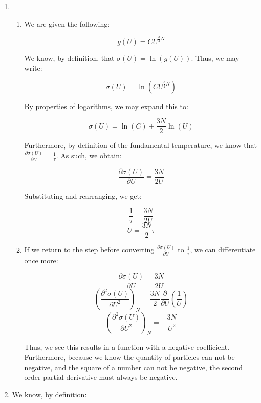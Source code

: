 \begin{enumerate}

  \item

    \begin{enumerate}

      \item 

        We are given the following:

        $$g(U)=CU^{\frac{3}{2}N}$$

        We know, by definition, that $\sigma(U)=\ln(g(U))$. Thus, we may write:

        $$\sigma(U)=\ln(CU^{\frac{3}{2}N})$$

        By properties of logarithms, we may expand this to:

        $$\sigma(U)=\ln(C)+\frac{3N}{2}\ln(U)$$

        Furthermore, by definition of the fundamental temperature, we know that $\displaystyle\frac{\partial\sigma(U)}{\partial U}=\frac{1}{\tau}$. As such, we obtain:

        $$\frac{\partial \sigma(U)}{\partial U}=\frac{3N}{2U}$$

        Substituting and rearranging, we get:

        $$\frac{1}{\tau}=\frac{3N}{2U}$$
        $$\boxed{U=\frac{3N}{2}\tau}$$

      \item 

        If we return to the step before converting $\displaystyle\frac{\partial\sigma(U)}{\partial U}$ to $\frac{1}{\tau}$, we can differentiate once more:

        $$\frac{\partial \sigma(U)}{\partial U}=\frac{3N}{2U}$$
        $$\left(\frac{\partial^2\sigma(U)}{\partial U^2}\right)_N=\frac{3N}{2}\frac{\partial}{\partial U}\left( \frac{1}{U} \right)$$
        $$\boxed{\left(\frac{\partial^2\sigma(U)}{\partial U^2}\right)_N=-\frac{3N}{U^2}}$$

        Thus, we see this results in a function with a negative coefficient. Furthermore, because we know the quantity of particles can not be negative, and the square of a number can not be negative, the second order partial derivative must always be negative.

    \end{enumerate}

  \item

    We know, by definition:


\end{enumerate}
